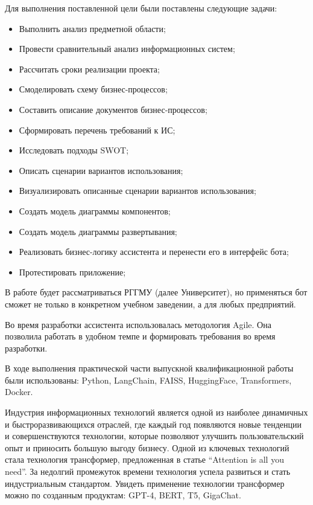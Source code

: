 Для выполнения поставленной цели были поставлены следующие задачи:
\begin{itemize}
    \item Выполнить анализ предметной области;
    \item Провести сравнительный анализ информационных систем;
    \item Рассчитать сроки реализации проекта;
    \item Смоделировать схему бизнес-процессов;
    \item Составить описание документов бизнес-процессов;
    \item Сформировать перечень требований к ИС;
    \item Исследовать подходы SWOT\@;
    \item Описать сценарии вариантов использования;
    \item Визуализировать описанные сценарии вариантов использования;
    \item Создать модель диаграммы компонентов;
    \item Создать модель диаграммы развертывания;
    \item Реализовать бизнес-логику ассистента и перенести его в интерфейс бота;
    \item Протестировать приложение;
\end{itemize}

В работе будет рассматриваться РГГМУ (далее Университет), но применяться бот
сможет не только в конкретном учебном заведении, а для любых предприятий.

Во время разработки ассистента использовалась методология Agile. Она позволила
работать в удобном темпе и формировать требования во время разработки.

В ходе выполнения практической части выпускной квалификационной
работы были использованы: Python, LangChain, FAISS, HuggingFace,
Transformers, Docker.


Индустрия информационных технологий является одной из наиболее динамичных и 
быстроразвивающихся отраслей, где каждый год появляются новые тенденции и
совершенствуются технологии, которые позволяют улучшить пользовательский опыт 
и приносить большую выгоду бизнесу. Одной из ключевых технологий стала 
технология трансформер, предложенная в статье “Attention is all you need”.
За недолгий промежуток времени технология успела развиться и стать
индустриальным стандартом. Увидеть применение технологии трансформер можно по
созданным продуктам: GPT-4, BERT, T5, GigaChat.

